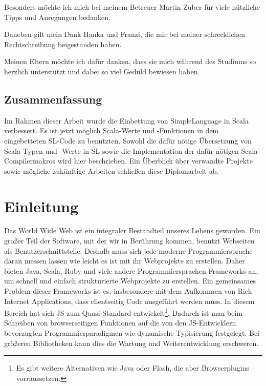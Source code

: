 \documentclass[12pt,bibtotoc]{scrreprt}
\begin{document}
Besonders möchte ich mich bei meinem Betreuer Martin Zuber für viele nützliche Tipps und Anregungen bedanken.

Daneben gilt mein Dank Hanka und Franzi, die mir bei meiner schrecklichen Rechtschreibung beigestanden haben.

Meinen Eltern möchte ich dafür danken, dass sie mich während des Studiums so herzlich unterstützt und dabei so viel Geduld bewiesen haben.

\newpage


\lstset{basicstyle=\ttfamily\small, numbers=left, numberstyle=\tiny}

\section*{Zusammenfassung}
\setcounter{page}{1}

Im Rahmen dieser Arbeit wurde die Einbettung von SimpleLanguage in Scala verbessert. Es ist jetzt möglich Scala-Werte und -Funktionen in dem eingebetteten SL-Code zu benutzten. Sowohl die dafür nötige Übersetzung von Scala-Typen und -Werte in SL sowie die Implementation der dafür nötigen Scala-Compilermakros wird hier beschrieben. Ein Überblick über verwandte Projekte sowie mögliche zukünftige Arbeiten schließen diese Diplomarbeit ab.

\chapter{Einleitung}


Das World Wide Web ist ein integraler Bestandteil unseres Lebens geworden. Ein großer Teil der Software, mit der wir in Berührung kommen, benutzt Webseiten als Benutzerschnittstelle. Deshalb muss sich jede moderne Programmiersprache daran messen lassen wie leicht es ist mit ihr Webprojekte zu erstellen. Daher bieten Java, Scala, Ruby und viele andere Programmiersprachen Frameworks an, um schnell und einfach strukturierte Webprojekte zu erstellen. Ein gemeinsames Problem dieser Frameworks ist es, insbesondere mit dem Aufkommen von Rich Internet Applications, dass clientseitig Code ausgeführt werden muss. In diesem Bereich hat sich \ac{JS} zum Quasi-Standard entwickelt\footnote{Es gibt weitere Alternativen wie Java oder Flash, die aber Browserplugins vorraussetzen.}. Dadurch ist man beim Schreiben von browserseitigen Funktionen auf die von den JS-Entwicklern bevorzugten Programmierparadigmen wie dynamische Typisierung festgelegt. Bei größeren Bibliotheken kann dies die Wartung und Weiterentwicklung erschweren.
\end{document}
